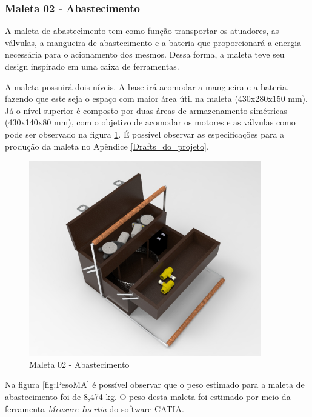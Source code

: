 \subsubsection{Maleta 02 - Abastecimento}
\label{maleta_02}
A maleta de abastecimento tem como função transportar os atuadores, as válvulas, a mangueira de abastecimento e a bateria que proporcionará a energia necessária para o acionamento dos mesmos. Dessa forma, a maleta teve seu design inspirado em uma caixa de ferramentas. 
\par A maleta possuirá dois níveis. A base irá acomodar a mangueira e a bateria, fazendo que este seja o espaço com maior área útil na maleta (430x280x150 mm). Já o nível superior é composto por duas áreas de armazenamento simétricas (430x140x80 mm), com o objetivo de acomodar os motores e as válvulas como pode ser observado na figura \ref{fig:Render Maleta Alimentacao}. É possível observar as especificações para a produção da maleta no Apêndice \ref{Drafts_do_projeto}.

\begin{figure}[H]
\centering
\includegraphics[width=0.9\textwidth]{figuras/Render Maleta Alimentacao.jpg}
\caption{Maleta 02 - Abastecimento}
\label{fig:Render Maleta Alimentacao}
\end{figure}

\par Na figura \ref{fig:PesoMA} é possível observar que o peso estimado para a maleta de abastecimento foi de 8,474 kg. O peso desta maleta foi estimado por meio da ferramenta \textit{Measure Inertia} do software CATIA.

